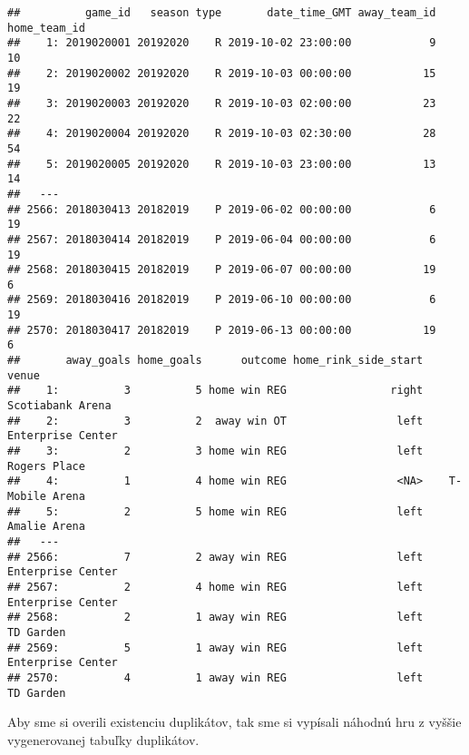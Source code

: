 \documentclass[
]{article}
\newenvironment{Shaded}{\begin{snugshade}}{\end{snugshade}}
\newcommand{\DecValTok}[1]{\textcolor[rgb]{0.00,0.00,0.81}{#1}}
\newcommand{\NormalTok}[1]{#1}
\newcommand{\SpecialCharTok}[1]{\textcolor[rgb]{0.00,0.00,0.00}{#1}}
\begin{document}
\begin{verbatim}
##          game_id   season type       date_time_GMT away_team_id home_team_id
##    1: 2019020001 20192020    R 2019-10-02 23:00:00            9           10
##    2: 2019020002 20192020    R 2019-10-03 00:00:00           15           19
##    3: 2019020003 20192020    R 2019-10-03 02:00:00           23           22
##    4: 2019020004 20192020    R 2019-10-03 02:30:00           28           54
##    5: 2019020005 20192020    R 2019-10-03 23:00:00           13           14
##   ---                                                                       
## 2566: 2018030413 20182019    P 2019-06-02 00:00:00            6           19
## 2567: 2018030414 20182019    P 2019-06-04 00:00:00            6           19
## 2568: 2018030415 20182019    P 2019-06-07 00:00:00           19            6
## 2569: 2018030416 20182019    P 2019-06-10 00:00:00            6           19
## 2570: 2018030417 20182019    P 2019-06-13 00:00:00           19            6
##       away_goals home_goals      outcome home_rink_side_start             venue
##    1:          3          5 home win REG                right  Scotiabank Arena
##    2:          3          2  away win OT                 left Enterprise Center
##    3:          2          3 home win REG                 left      Rogers Place
##    4:          1          4 home win REG                 <NA>    T-Mobile Arena
##    5:          2          5 home win REG                 left      Amalie Arena
##   ---                                                                          
## 2566:          7          2 away win REG                 left Enterprise Center
## 2567:          2          4 home win REG                 left Enterprise Center
## 2568:          2          1 away win REG                 left         TD Garden
## 2569:          5          1 away win REG                 left Enterprise Center
## 2570:          4          1 away win REG                 left         TD Garden
\end{verbatim}

Aby sme si overili existenciu duplikátov, tak sme si vypísali náhodnú
hru z vyššie vygenerovanej tabuľky duplikátov.

\begin{Shaded}
\end{Shaded}
\end{document}
